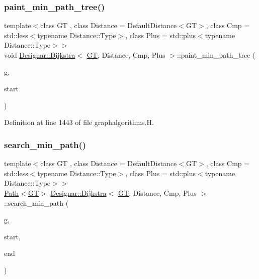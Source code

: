 \subsubsection{\texorpdfstring{paint\+\_\+min\+\_\+path\+\_\+tree()}{paint\_min\_path\_tree()}}
{\footnotesize\ttfamily template$<$class GT , class Distance  = Default\+Distance$<$\+G\+T$>$, class Cmp  = std\+::less$<$typename Distance\+::\+Type$>$, class Plus  = std\+::plus$<$typename Distance\+::\+Type$>$$>$ \\
void \hyperlink{class_designar_1_1_dijkstra}{Designar\+::\+Dijkstra}$<$ \hyperlink{demo-buildgraph_8_c_a3001c40d2c31ca87ed96cd7d1334a55e}{GT}, Distance, Cmp, Plus $>$\+::paint\+\_\+min\+\_\+path\+\_\+tree (\begin{DoxyParamCaption}\item[{\hyperlink{demo-buildgraph_8_c_a3001c40d2c31ca87ed96cd7d1334a55e}{GT} \&}]{g,  }\item[{\hyperlink{class_designar_1_1_dijkstra_afeb644fc5395569ec366f0d220ab477d}{Node} \&}]{start }\end{DoxyParamCaption})\hspace{0.3cm}{\ttfamily [inline]}}



Definition at line 1443 of file graphalgorithms.\+H.

\mbox{\label{class_designar_1_1_dijkstra_ab2d75c571dff03279bea0192047461f0}} 
\subsubsection{\texorpdfstring{search\+\_\+min\+\_\+path()}{search\_min\_path()}}
{\footnotesize\ttfamily template$<$class GT , class Distance  = Default\+Distance$<$\+G\+T$>$, class Cmp  = std\+::less$<$typename Distance\+::\+Type$>$, class Plus  = std\+::plus$<$typename Distance\+::\+Type$>$$>$ \\
\hyperlink{class_designar_1_1_path}{Path}$<$\hyperlink{demo-buildgraph_8_c_a3001c40d2c31ca87ed96cd7d1334a55e}{GT}$>$ \hyperlink{class_designar_1_1_dijkstra}{Designar\+::\+Dijkstra}$<$ \hyperlink{demo-buildgraph_8_c_a3001c40d2c31ca87ed96cd7d1334a55e}{GT}, Distance, Cmp, Plus $>$\+::search\+\_\+min\+\_\+path (\begin{DoxyParamCaption}\item[{\hyperlink{demo-buildgraph_8_c_a3001c40d2c31ca87ed96cd7d1334a55e}{GT} \&}]{g,  }\item[{\hyperlink{class_designar_1_1_dijkstra_afeb644fc5395569ec366f0d220ab477d}{Node} \&}]{start,  }\item[{\hyperlink{class_designar_1_1_dijkstra_afeb644fc5395569ec366f0d220ab477d}{Node} \&}]{end }\end{DoxyParamCaption})\hspace{0.3cm}{\ttfamily [inline]}}



